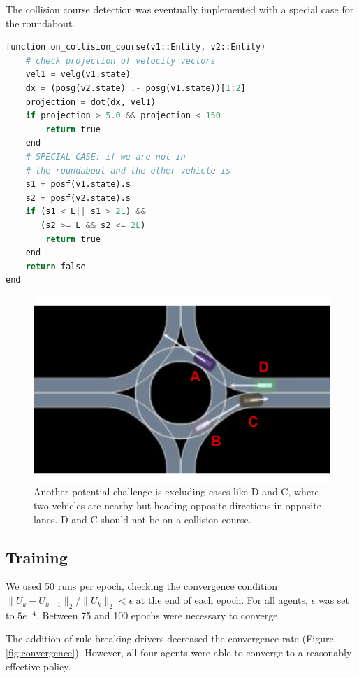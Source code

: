 \documentclass[conference]{IEEEtran}
\begin{document}
The collision course detection was eventually implemented with a special case for the roundabout.
\begin{lstlisting}[language=python, caption={Collision detection.}]
function on_collision_course(v1::Entity, v2::Entity)
	# check projection of velocity vectors
	vel1 = velg(v1.state)
	dx = (posg(v2.state) .- posg(v1.state))[1:2]
	projection = dot(dx, vel1)
	if projection > 5.0 && projection < 150
		return true
	end
	# SPECIAL CASE: if we are not in
	# the roundabout and the other vehicle is
	s1 = posf(v1.state).s
	s2 = posf(v2.state).s
	if (s1 < L|| s1 > 2L) &&
	   (s2 >= L && s2 <= 2L)
		return true
	end
	return false
end
\end{lstlisting}
\begin{figure}[h]
	\centering
	\includegraphics[width=0.8\linewidth]{figures/example_bug.pdf}
	\caption{Another potential challenge is excluding cases like D and C, where two vehicles are nearby but heading opposite directions in opposite lanes. D and C should not be on a collision course.}
	\label{fig:bug}
\end{figure}

\subsection*{Training}
We used 50 runs per epoch, checking the convergence condition $\|U_k-U_{k-1}\|_2 / \|U_k\|_2 <\epsilon$ at the end of each epoch. For all agents, $\epsilon$ was set to $5e^{-4}$. Between 75 and 100 epochs were necessary to converge.

The addition of rule-breaking drivers decreased the convergence rate (Figure \ref{fig:convergence}). However, all four agents were able to converge to a reasonably effective policy.
\end{document}
